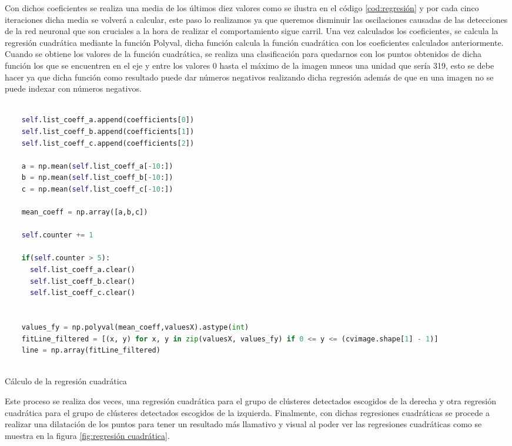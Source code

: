 Con dichos coeficientes se realiza una media de los últimos diez valores como se ilustra en el código \ref{cod:regresión} y por cada cinco iteraciones dicha media se volverá a calcular, este paso lo realizamos ya que 
queremos disminuir las oscilaciones causadas de las detecciones de la red neuronal que son cruciales a la hora de realizar el comportamiento sigue carril. Una vez calculados los coeficientes, se calcula la regresión cuadrática mediante la función Polyval, dicha función calcula
la función cuadrática con los coeficientes calculados anteriormente. \newline 
Cuando se obtiene los valores de la función cuadrática, se realiza una clasificación para quedarnos con los puntos obtenidos
de dicha función los que se encuentren en el eje y entre los valores 0 hasta el máximo de la imagen mneos una unidad que sería 319, esto se debe hacer ya que dicha función como resultado puede 
dar números negativos realizando dicha regresión además de que en una imagen no se puede indexar con números negativos. \newline

\begin{code}[H]
  \begin{lstlisting}[language=Python]

    self.list_coeff_a.append(coefficients[0])
    self.list_coeff_b.append(coefficients[1])
    self.list_coeff_c.append(coefficients[2])

    a = np.mean(self.list_coeff_a[-10:])
    b = np.mean(self.list_coeff_b[-10:])
    c = np.mean(self.list_coeff_c[-10:])

    mean_coeff = np.array([a,b,c])

    self.counter += 1

    if(self.counter > 5):
      self.list_coeff_a.clear()
      self.list_coeff_b.clear()
      self.list_coeff_c.clear()  


    values_fy = np.polyval(mean_coeff,valuesX).astype(int)
    fitLine_filtered = [(x, y) for x, y in zip(valuesX, values_fy) if 0 <= y <= (cvimage.shape[1] - 1)]
    line = np.array(fitLine_filtered)
   

  \end{lstlisting}
  \caption[Cálculo de la regresión cuadrática]{Cálculo de la regresión cuadrática}
  \label{cod:regresión}
  \end{code}  

Este proceso se realiza dos veces, una regresión cuadrática para el grupo de clústeres detectados escogidos de la derecha y otra regresión cuadrática para el grupo de clústeres detectados
escogidos de la izquierda. \newline
Finalmente, con dichas regresiones cuadráticas se procede a realizar una dilatación de los puntos para tener un resultado más llamativo y visual al poder
ver las regresiones cuadráticas como se muestra en la figura \ref{fig:regresión cuadrática}.\newline

